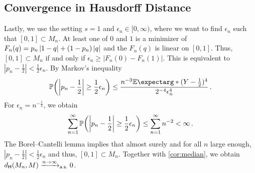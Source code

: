 \subsection{Convergence in Hausdorff Distance}
Lastly, we use the setting $s=1$ and $\epsilon_n\in[0,\infty)$, where we want to find $\epsilon_n$ such that $[0,1] \subset M_n$.
At least one of $0$ and $1$ is a minimizer of $F_n(q)=p_n\left| 1-q \right|+(1-p_n)\left| q \right|$ and the $F_n(q)$ is linear on $[0,1]$. Thus, $[0,1] \subset M_n$ if and only if  $\epsilon_n \geq |F_n(0)-F_n(1)|$. This is equivalent to 
 $|p_n-\frac12| < \frac12\epsilon_n$.
By Markov's inequality
\begin{equation*}
	\PrOf{\abs{p_n-\frac12} \geq \frac12\epsilon_n} \leq \frac{n^{-3} \Ex*{(Y-\frac12)^4}}{2^{-4}\epsilon_n^4}
	\eqfs
\end{equation*}
For $\epsilon_n = n^{-\frac14}$, we obtain
\begin{equation*}
	\sum_{n=1}^\infty \mathbb{P}\mathopen{}\left( \left| p_n-\frac12 \right| \geq \frac12\epsilon_n \right)\mathclose{}  \leq \sum_{n=1}^\infty n^{-2} < \infty
	\, .
\end{equation*}
The Borel--Cantelli lemma implies that almost surely and for all $n$ large enough,  $|p_n-\frac12| < \frac12\epsilon_n$ and thus, $[0,1] \subset M_n$. 
Together with \autoref{cor:median}, we obtain $d_{\mathsf{H}}(M_n, M) \xrightarrow{n\to\infty}_{\mathsf{a.s.}} 0$.
%